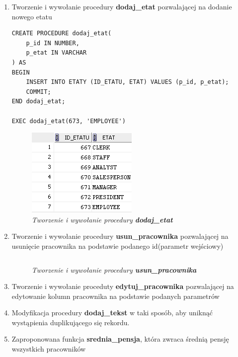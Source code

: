 \documentclass{article}
\begin{document}
\begin{enumerate}
\item Tworzenie i wywołanie procedury \textbf{dodaj\_etat} pozwalającej na dodanie nowego etatu

\begin{lstlisting}[style=SQL, caption=\textit{Tworzenie i wywołanie procedury \textbf{dodaj\_etat}}]
CREATE PROCEDURE dodaj_etat(
	p_id IN NUMBER,
	p_etat IN VARCHAR
) AS
BEGIN
	INSERT INTO ETATY (ID_ETATU, ETAT) VALUES (p_id, p_etat);
	COMMIT;
END dodaj_etat;

EXEC dodaj_etat(673, 'EMPLOYEE')
\end{lstlisting}

		\begin{figure}[H]
			\centering
			\includegraphics[scale=1.2]{zadanie1.png}
			\caption{\textit{Tworzenie i wywołanie procedury \textbf{dodaj\_etat}}}
		\end{figure}

\item Tworzenie i wywołanie procedury \textbf{usun\_pracownika} pozwalającej na usunięcie pracownika na podstawie podanego id(parametr wejściowy)

	\begin{lstlisting}[style=SQL, caption=\textit{Tworzenie i wywołanie procedury \textbf{usun\_pracownika}}]
	\end{lstlisting}

		\begin{figure}[H]
			\centering
			\caption{\textit{Tworzenie i wywołanie procedury \textbf{usun\_pracownika}}}
		\end{figure}

\item Tworzenie i wywołanie proceduty \textbf{edytuj\_pracownika} pozwalającej na edytowanie kolumn pracownika na podstawie podanych parametrów

\item Modyfikacja procedury \textbf{dodaj\_tekst} w taki sposób, aby uniknąć wystąpienia duplikującego się rekordu.

\item Zaproponowana funkcja \textbf{srednia\_pensja}, która zwraca średnią pensję wszystkich pracowników


\end{enumerate}
\end{document}
